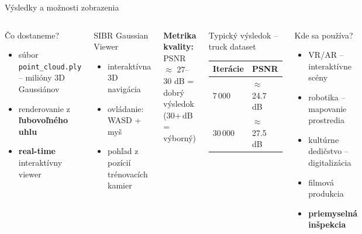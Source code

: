 \documentclass[aspectratio=169]{beamer}
\begin{document}
\begin{frame}{Výsledky a možnosti zobrazenia}

\begin{columns}[t]

\begin{block}{Čo dostaneme?}
\begin{itemize}\setlength{\itemsep}{2pt}
    \item súbor \texttt{point\_cloud.ply} – milióny 3D Gaussiánov
    \item renderovanie z \textbf{ľubovoľného uhlu}
    \item \textbf{real-time} interaktívny viewer
\end{itemize}
\end{block}

\vspace{0.1cm}
\begin{block}{SIBR Gaussian Viewer}
\begin{itemize}\setlength{\itemsep}{2pt}
    \item interaktívna 3D navigácia
    \item ovládanie: WASD + myš
    \item pohľad z pozícií trénovacích kamier
\end{itemize}
\end{block}

\vspace{0.1cm}
\textbf{Metrika kvality:}\enspace
{\small PSNR $\approx$ 27–30 dB = dobrý výsledok\enspace
{\footnotesize(30+\,dB = výborný)}}


\begin{block}{Typický výsledok – truck dataset}
\begin{tabular}{ll}
\toprule
Iterácie & PSNR \\
\midrule
7\,000   & $\approx$ 24.7 dB \\
30\,000  & $\approx$ 27.5 dB \\
\bottomrule
\end{tabular}
\end{block}

\vspace{0.1cm}
\begin{block}{Kde sa používa?}
\begin{itemize}\setlength{\itemsep}{2pt}
    \item VR/AR – interaktívne scény
    \item robotika – mapovanie prostredia
    \item kultúrne dedičstvo – digitalizácia
    \item filmová produkcia
    \item \textbf{priemyselná inšpekcia}
\end{itemize}
\end{block}

\end{columns}

\end{frame}
\end{document}

